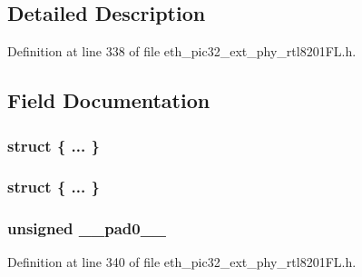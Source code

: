\subsection{Detailed Description}


Definition at line 338 of file eth\+\_\+pic32\+\_\+ext\+\_\+phy\+\_\+rtl8201\+F\+L.\+h.



\subsection{Field Documentation}
\hypertarget{union___f_i_b_e_r_m_o_d_e_a_n_d_l_o_o_p_b_a_c_k_m_o_d_e__t_a38983523d1ec5d7dd7ec01f79ea21774}{}\subsubsection[{"@144}]{\setlength{\rightskip}{0pt plus 5cm}struct \{ ... \} }\label{union___f_i_b_e_r_m_o_d_e_a_n_d_l_o_o_p_b_a_c_k_m_o_d_e__t_a38983523d1ec5d7dd7ec01f79ea21774}
\hypertarget{union___f_i_b_e_r_m_o_d_e_a_n_d_l_o_o_p_b_a_c_k_m_o_d_e__t_a4cbbaeac30c203c3b645fbb00a165a8a}{}\subsubsection[{"@146}]{\setlength{\rightskip}{0pt plus 5cm}struct \{ ... \} }\label{union___f_i_b_e_r_m_o_d_e_a_n_d_l_o_o_p_b_a_c_k_m_o_d_e__t_a4cbbaeac30c203c3b645fbb00a165a8a}
\hypertarget{union___f_i_b_e_r_m_o_d_e_a_n_d_l_o_o_p_b_a_c_k_m_o_d_e__t_adf71f3d8410c1f1dbbc96680a92c49af}{}
\subsubsection[{\+\_\+\+\_\+pad0\+\_\+\+\_\+}]{\setlength{\rightskip}{0pt plus 5cm}unsigned \+\_\+\+\_\+pad0\+\_\+\+\_\+}\label{union___f_i_b_e_r_m_o_d_e_a_n_d_l_o_o_p_b_a_c_k_m_o_d_e__t_adf71f3d8410c1f1dbbc96680a92c49af}


Definition at line 340 of file eth\+\_\+pic32\+\_\+ext\+\_\+phy\+\_\+rtl8201\+F\+L.\+h.

